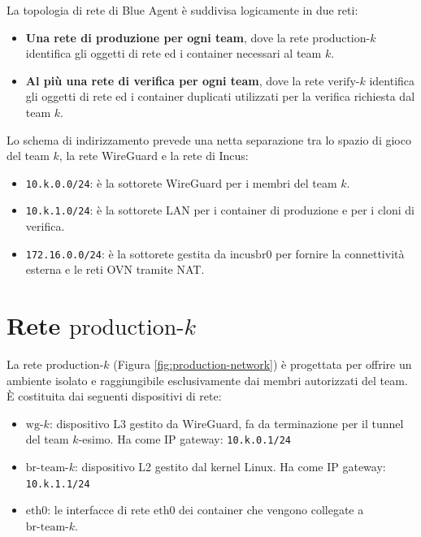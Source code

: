 La topologia di rete di Blue Agent è suddivisa logicamente in due reti:

\begin{itemize}
\tightlist
\item
  \textbf{Una rete di produzione per ogni team}, dove la rete
  \(\text{production-}k\) identifica gli oggetti di rete ed i container
  necessari al team \(k\).
\item
  \textbf{Al più una rete di verifica per ogni team}, dove la rete
  \(\text{verify-}k\) identifica gli oggetti di rete ed i container
  duplicati utilizzati per la verifica richiesta dal team \(k\).
\end{itemize}

Lo schema di indirizzamento prevede una netta separazione tra lo spazio
di gioco del team \(k\), la rete WireGuard e la rete di Incus:

\begin{itemize}
\tightlist
\item
  \passthrough{\lstinline!10.k.0.0/24!}: è la sottorete WireGuard per i
  membri del team \(k\).
\item
  \passthrough{\lstinline!10.k.1.0/24!}: è la sottorete LAN per i
  container di produzione e per i cloni di verifica.
\item
  \passthrough{\lstinline!172.16.0.0/24!}: è la sottorete gestita da
  \(\text{incusbr0}\) per fornire la connettività esterna e le reti OVN
  tramite NAT.
\end{itemize}

\section{\texorpdfstring{Rete
\(\text{production-}k\)}{Rete \textbackslash text\{production-\}k}}\label{rete-textproduction-k}

La rete \(\text{production-}k\) (Figura \ref{fig:production-network}) è
progettata per offrire un ambiente isolato e raggiungibile
esclusivamente dai membri autorizzati del team. È costituita dai
seguenti dispositivi di rete:

\begin{itemize}
\tightlist
\item
  \(\text{wg-}k\): dispositivo L3 gestito da WireGuard, fa da
  terminazione per il tunnel del team \(k\)-esimo. Ha come IP gateway:
  \passthrough{\lstinline!10.k.0.1/24!}
\item
  \(\text{br-team-}k\): dispositivo L2 gestito dal kernel Linux. Ha come
  IP gateway: \passthrough{\lstinline!10.k.1.1/24!}
\item
  \(\text{eth0}\): le interfacce di rete \(\text{eth0}\) dei container
  che vengono collegate a \(\text{br-team-}k\).
\end{itemize}

